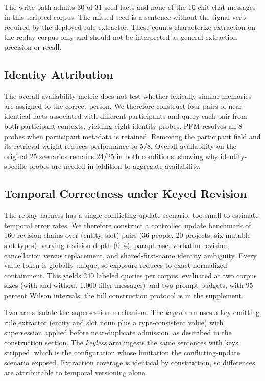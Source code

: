 \documentclass[letterpaper]{article} %
\begin{document}
The write path admits 30 of 31 seed facts and none of the 16 chit-chat messages in this scripted corpus. The missed seed is a sentence without the signal verb required by the deployed rule extractor. These counts characterize extraction on the replay corpus only and should not be interpreted as general extraction precision or recall.

\subsection{Identity Attribution}

The overall availability metric does not test whether lexically similar memories are assigned to the correct person. We therefore construct four pairs of near-identical facts associated with different participants and query each pair from both participant contexts, yielding eight identity probes. PFM resolves all 8 probes when participant metadata is retained. Removing the participant field and its retrieval weight reduces performance to 5/8. Overall availability on the original 25 scenarios remains 24/25 in both conditions, showing why identity-specific probes are needed in addition to aggregate availability.

\subsection{Temporal Correctness under Keyed Revision}

The replay harness has a single conflicting-update scenario, too small to estimate temporal error rates. We therefore construct a controlled update benchmark of 160 revision chains over (entity, slot) pairs (36 people, 20 projects, six mutable slot types), varying revision depth ($0$--$4$), paraphrase, verbatim revision, cancellation versus replacement, and shared-first-name identity ambiguity. Every value token is globally unique, so exposure reduces to exact normalized containment. This yields 240 labeled queries per corpus, evaluated at two corpus sizes (with and without 1{,}000 filler messages) and two prompt budgets, with 95 percent Wilson intervals; the full construction protocol is in the supplement.

Two arms isolate the supersession mechanism. The \emph{keyed} arm uses a key-emitting rule extractor (entity and slot noun plus a type-consistent value) with supersession applied before near-duplicate admission, as described in the construction section. The \emph{keyless} arm ingests the same sentences with keys stripped, which is the configuration whose limitation the conflicting-update scenario exposed. Extraction coverage is identical by construction, so differences are attributable to temporal versioning alone.
\end{document}
